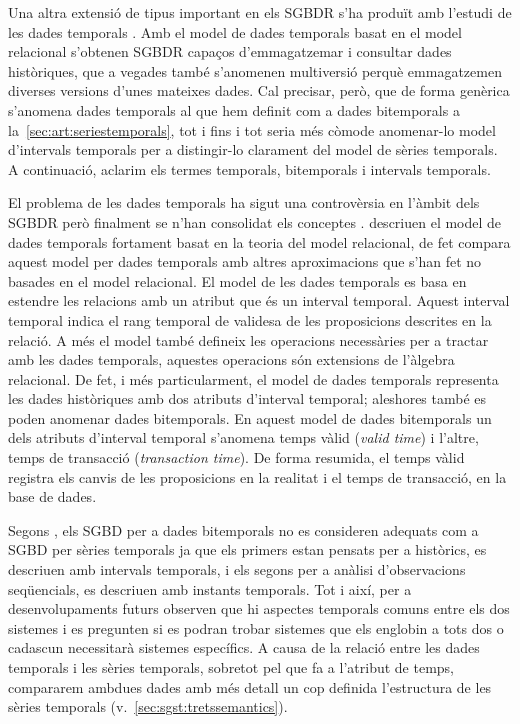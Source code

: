 Una altra extensió de tipus important en els \gls{SGBDR} s'ha produït
amb l'estudi de les dades
temporals \parencite{date02:_tempor_data_relat_model}.  Amb el model
de dades temporals basat en el model relacional s'obtenen \gls{SGBDR}
capaços d'emmagatzemar i consultar dades històriques, que a vegades
també s'anomenen multiversió perquè emmagatzemen diverses versions
d'unes mateixes dades. Cal precisar, però, que de forma genèrica
s'anomena dades temporals al que hem definit com a dades bitemporals a
la~\autoref{sec:art:seriestemporals}, tot i fins i tot seria més
còmode anomenar-lo model d'intervals temporals per a distingir-lo
clarament del model de sèries temporals. A continuació, aclarim els
termes temporals, bitemporals i intervals temporals.


El problema de les dades temporals ha sigut una controvèrsia en
l'àmbit dels \gls{SGBDR} però finalment se n'han consolidat els
conceptes
\parencite{jensen99:temporaldata,jensen98:temporal_database_glossary,tansel93:temporal_databases}. %
\textcite{date02:_tempor_data_relat_model} descriuen el model de dades
temporals fortament basat en la teoria del model relacional, de fet
\textcite[cap.~28]{date06} compara aquest model per dades temporals
amb altres aproximacions que s'han fet no basades en el model
relacional.  El model de les dades
temporals \parencite{date02:_tempor_data_relat_model} es basa en
estendre les relacions amb un atribut que és un interval
temporal. Aquest interval temporal indica el rang temporal de validesa
de les proposicions descrites en la relació. A més el model també
defineix les operacions necessàries per a tractar amb les dades
temporals, aquestes operacions són extensions de l'àlgebra relacional.
De fet, i més particularment, el model de dades temporals representa
les dades històriques amb dos atributs d'interval temporal; aleshores
també es poden anomenar dades bitemporals. En aquest model de dades
bitemporals
\parencite[cap.~15]{date02:_tempor_data_relat_model,jensen99:temporaldata} %
un dels atributs d'interval temporal s'anomena temps vàlid
(\emph{valid time}) i l'altre, temps de transacció (\emph{transaction
  time}). De forma resumida, el temps vàlid registra els canvis de les
proposicions en la realitat i el temps de transacció, en la base de
dades.




Segons \textcite{schmidt95}, els \gls{SGBD} per a dades bitemporals no
es consideren adequats com a \gls{SGBD} per sèries temporals ja que
els primers estan pensats per a històrics, es descriuen amb intervals
temporals, i els segons per a anàlisi d'observacions seqüencials, es
descriuen amb instants temporals. Tot i així, per a desenvolupaments
futurs observen que hi aspectes temporals comuns entre els dos
sistemes i es pregunten si es podran trobar sistemes que els englobin
a tots dos o cadascun necessitarà sistemes específics.  A causa de la
relació entre les dades temporals i les sèries temporals, sobretot pel
que fa a l'atribut de temps, compararem ambdues dades amb més detall
un cop definida l'estructura de les sèries temporals
(v.~\autoref{sec:sgst:tretssemantics}).


